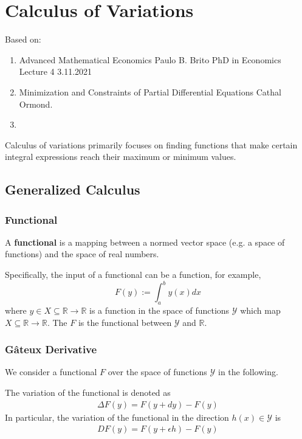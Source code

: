 \documentclass[11pt]{elegantbook}
\begin{document}
\chapter{Calculus of Variations}
Based on:
\begin{enumerate}[$\circ$]
    \item Advanced Mathematical Economics Paulo B. Brito PhD in Economics Lecture 4 3.11.2021
    \item Minimization and Constraints of Partial Differential Equations Cathal Ormond.
    \item 
\end{enumerate}
Calculus of variations primarily focuses on finding functions that make certain integral expressions reach their maximum or minimum values.

\section{Generalized Calculus}
\subsection{Functional}
\begin{definition}[functional]
    A \textbf{functional} is a mapping between a normed vector space (e.g. a space of functions) and the space of real numbers.
\end{definition}
\begin{example}
    Specifically, the input of a functional can be a function, for example, $$F(y):=\int_a^b y(x) dx$$ where $y\in X\subseteq \mathbb{R} \rightarrow \mathbb{R}$ is a function in the space of functions $\mathcal{Y}$ which map $X\subseteq \mathbb{R} \rightarrow \mathbb{R}$. The $F$ is the functional between $\mathcal{Y}$ and $\mathbb{R}$.
\end{example}


\subsection{Gâteux Derivative}
We consider a functional $F$ over the space of functions $\mathcal{Y}$ in the following.

The variation of the functional is denoted as
\begin{equation}
    \begin{aligned}
        \Delta F(y) = F(y+dy) - F(y)
    \end{aligned}
    \nonumber
\end{equation}
In particular, the variation of the functional in the direction $h(x)\in \mathcal{Y}$ is
\begin{equation}
    \begin{aligned}
        DF(y)=F(y+\epsilon h)-F(y)
    \end{aligned}
    \nonumber
\end{equation}
\end{document}
